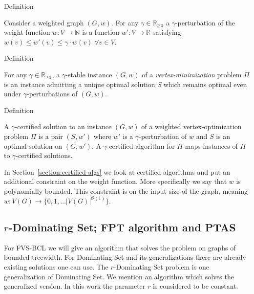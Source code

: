 \begin{mydefinition}{Definition}
    \label{gpvop}

    Consider a weighted graph $(G, w)$. For any $\gamma \in \mathbb{R_{\geq \text{1}}}$ a $\gamma$-perturbation of the weight function 
    $w : V \to \mathbb{N}$ is a function $w' : V \to \mathbb{R}$ satisfying $w(v) \leq w'(v) \leq \gamma \cdot w(v) \; \forall v \in V$.

\end{mydefinition}

\begin{mydefinition}{Definition}
    \label{gs}

    For any $\gamma \in \mathbb{R_{\geq \text{1}}}$, a $\gamma$-stable instance $(G, w)$ of a \textit{vertex-minimization} problem 
    $\Pi$  is an instance admitting a unique optimal solution \textit{S} which remains optimal even under $\gamma$-perturbations of 
    $(G, w)$.

\end{mydefinition}

\begin{mydefinition}{Definition}
    \label{ca}

    A $\gamma$-certified solution to an instance $(G, w)$ of a weighted vertex-optimization problem $\Pi$ is a pair $(S, w')$ 
    where $w'$ is a $\gamma$-perturbation of $w$ and $S$ is an optimal solution on $(G, w')$. A $\gamma$-certified algorithm 
    for $\Pi$ maps instances of $\Pi$ to $\gamma$-certified solutions. 

\end{mydefinition}

In Section~\ref{section:certified-algs} we look at certified algorithms and put an additional 
constraint on the weight function. More specifically we say that $w$ is polynomially-bounded. 
This constraint is on the input size of the graph, meaning 
$w : V(G) \to \{0, 1, \dots \left|V(G)\right|^{ \mathcal{O}(1)}\}$.

\subsection{$r$-Dominating Set; FPT algorithm and PTAS}

For FVS-BCL we will give an algorithm that solves the problem on graphs of bounded treewidth. 
For Dominating Set and its generalizations there are already existing solutions one can use. 
The $r$-Dominating Set problem is one generalization of Dominating Set. We mention an algorithm 
which solves the generalized version. In this work the parameter $r$ is considered to be 
constant.


